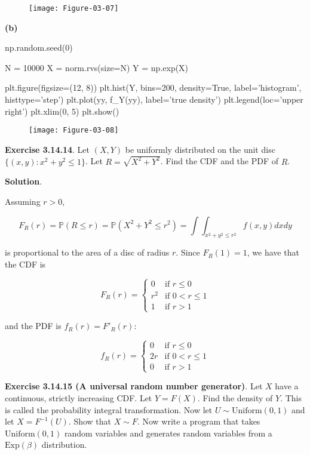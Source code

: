 \begin{figure}[H]
\centering
\texttt{[image: Figure-03-07]}
\end{figure}

\textbf{(b)}

\begin{python}
np.random.seed(0)

N = 10000
X = norm.rvs(size=N)
Y = np.exp(X)

plt.figure(figsize=(12, 8))
plt.hist(Y, bins=200, density=True, label='histogram', histtype='step')
plt.plot(yy, f_Y(yy), label='true density')
plt.legend(loc='upper right')
plt.xlim(0, 5)
plt.show()
\end{python}

\begin{figure}[H]
\centering
\texttt{[image: Figure-03-08]}
\end{figure}

\textbf{Exercise 3.14.14}. Let \((X, Y)\) be uniformly distributed on
the unit disc \(\{ (x, y) : x^{2} + y^{2} \leq 1 \}\). Let
\(R = \sqrt{X^{2} + Y^{2}}\). Find the CDF and the PDF of \(R\).

\textbf{Solution}.

Assuming \(r > 0\),

\[ F_R(r) = \mathbb{P}(R \leq r) = \mathbb{P}(X^{2} + Y^{2} \leq r^{2}) = \int \int_{x^{2} + y^{2} \leq r^{2}} f(x, y) dx dy \]

is proportional to the area of a disc of radius \(r\). Since
\(F_R(1) = 1\), we have that the CDF is

\[ 
F_R(r) = \begin{cases}
0 &\text{if } r \leq 0 \\
r^{2} &\text{if } 0 < r \leq 1 \\
1 &\text{if } r > 1
\end{cases}
\]

and the PDF is \(f_R(r) = F'_R(r)\):

\[
f_R(r) = \begin{cases}
0 &\text{if } r \leq 0 \\
2 r &\text{if } 0 < r \leq 1 \\
0 &\text{if } r > 1
\end{cases}
\]

\textbf{Exercise 3.14.15 (A universal random number generator)}. Let
\(X\) have a continuous, strictly increasing CDF. Let \(Y = F(X)\). Find
the density of \(Y\). This is called the probability integral
transformation. Now let \(U \sim \text{Uniform}(0, 1)\) and let
\(X = F^{-1}(U)\). Show that \(X \sim F\). Now write a program that
takes \(\text{Uniform}(0, 1)\) random variables and generates random
variables from a \(\text{Exp}(\beta)\) distribution.

